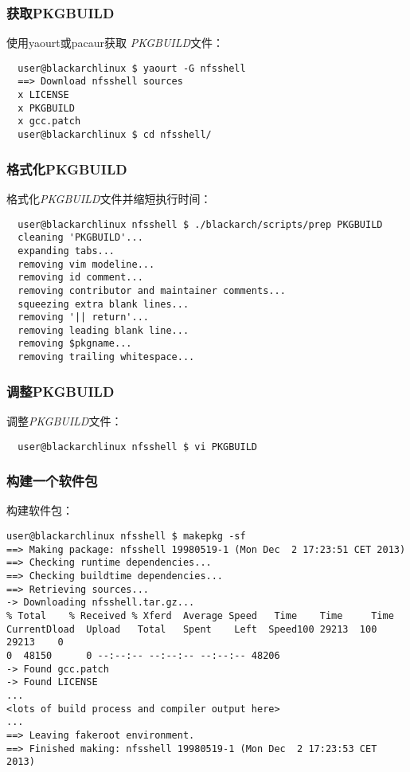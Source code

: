 \documentclass[a4paper, oneside, 11pt]{book}
\begin{document}
\subsubsection{获取PKGBUILD}
使用yaourt或pacaur获取 \textit{PKGBUILD}文件：
\begin{lstlisting}
  user@blackarchlinux $ yaourt -G nfsshell
  ==> Download nfsshell sources
  x LICENSE
  x PKGBUILD
  x gcc.patch
  user@blackarchlinux $ cd nfsshell/
\end{lstlisting}

\subsubsection{格式化PKGBUILD}
格式化\textit{PKGBUILD}文件并缩短执行时间：
\begin{lstlisting}
  user@blackarchlinux nfsshell $ ./blackarch/scripts/prep PKGBUILD
  cleaning 'PKGBUILD'...
  expanding tabs...
  removing vim modeline...
  removing id comment...
  removing contributor and maintainer comments...
  squeezing extra blank lines...
  removing '|| return'...
  removing leading blank line...
  removing $pkgname...
  removing trailing whitespace...
\end{lstlisting}

\subsubsection{调整PKGBUILD}
调整\textit{PKGBUILD}文件：
\begin{lstlisting}
  user@blackarchlinux nfsshell $ vi PKGBUILD
\end{lstlisting}

\subsubsection{构建一个软件包}
构建软件包：
\begin{lstlisting}user@blackarchlinux nfsshell $ makepkg -sf
==> Making package: nfsshell 19980519-1 (Mon Dec  2 17:23:51 CET 2013)
==> Checking runtime dependencies...
==> Checking buildtime dependencies...
==> Retrieving sources...
-> Downloading nfsshell.tar.gz...
% Total    % Received % Xferd  Average Speed   Time    Time     Time
CurrentDload  Upload   Total   Spent    Left  Speed100 29213  100 29213    0
0  48150      0 --:--:-- --:--:-- --:--:-- 48206
-> Found gcc.patch
-> Found LICENSE
...
<lots of build process and compiler output here>
...
==> Leaving fakeroot environment.
==> Finished making: nfsshell 19980519-1 (Mon Dec  2 17:23:53 CET 2013)
\end{lstlisting}
\end{document}
